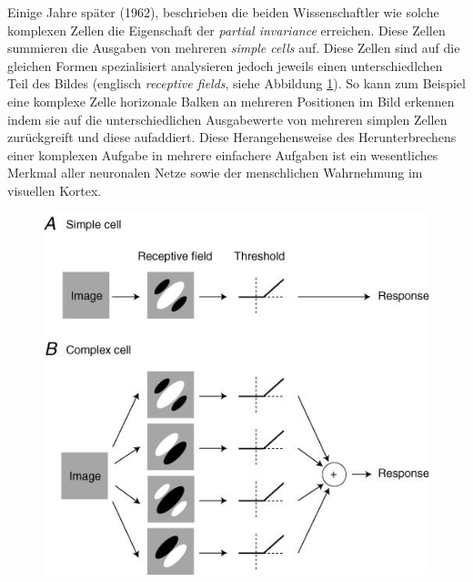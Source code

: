 Einige Jahre später (1962), beschrieben die beiden Wissenschaftler wie solche komplexen Zellen die Eigenschaft der \emph{partial invariance} erreichen. Diese Zellen summieren die Ausgaben von mehreren \emph{simple cells} auf. Diese Zellen sind auf die gleichen Formen spezialisiert analysieren jedoch jeweils einen unterschiedlchen Teil des Bildes (englisch \emph{receptive fields}, siehe Abbildung \ref{fig:simpleVsComplex}). So kann zum Beispiel eine komplexe Zelle horizonale Balken an mehreren Positionen im Bild erkennen indem sie auf die unterschiedlichen Ausgabewerte von mehreren simplen Zellen zurückgreift und diese aufaddiert. Diese Herangehensweise des Herunterbrechens einer komplexen Aufgabe in mehrere einfachere Aufgaben ist ein wesentliches Merkmal aller neuronalen Netze sowie der menschlichen Wahrnehmung im visuellen Kortex. 

\begin{figure}[!htb]
	\centering
	\includegraphics[width=.6\linewidth]{img/simpleVsComplex}
	\label{fig:simpleVsComplex}
\end{figure}
